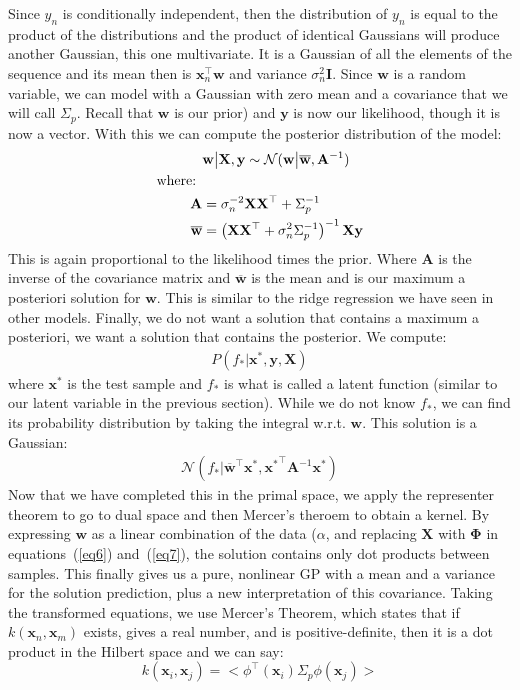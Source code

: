 \documentclass[journal]{IEEEtran}
\begin{document}
Since \(y_n\) is conditionally independent, then the distribution of \(y_n\) is equal to the product of the distributions and the product of identical Gaussians will produce another Gaussian, this one multivariate. It is a Gaussian of all the elements of the sequence and its mean then is \(\mathbf{x}_n^\top \mathbf{w}\) and variance \(\sigma_n^2 \mathbf{I}\). Since \(\mathbf{w}\) is a random variable, we can model with a Gaussian with zero mean and a covariance that we will call \(\Sigma_p\). Recall that \(\mathbf{w}\) is our prior) and \(\mathbf{y}\) is now our likelihood, though it is now a vector. With this we can compute the posterior distribution of the model:
\begin{align}
    &\mathbf{w} \big| \mathbf{X}, \mathbf{y} \sim \mathcal{N}(\mathbf{w}\big| \overline{\mathbf{w}}, \mathbf{A}^{-1})\\
    \notag\text{where: }\\
    \mathbf{A} &= \sigma_n^{-2}\mathbf{X}\mathbf{X}^\top + \Sigma_p^{-1}\label{eq6}\\
    \overline{\mathbf{w}} &= \left(\mathbf{X}\mathbf{X}^\top + \sigma_n^{2}\Sigma_p^{-1}\right)^{-1}\mathbf{X}\mathbf{y}\label{eq7}
\end{align}
This is again proportional to the likelihood times the prior. Where \(\mathbf{A}\) is the inverse of the covariance matrix and \(\overline{\mathbf{w}}\) is the mean and is our maximum a posteriori solution for \(\mathbf{w}\). This is similar to the ridge regression we have seen in other models. Finally, we do not want a solution that contains a maximum a posteriori, we want a solution that contains the posterior. We compute:
\begin{align}
    P(f_* \big| \mathbf{x}^*,\mathbf{y},\mathbf{X})
\end{align}
where \(\mathbf{x}^*\) is the test sample and \(f_*\) is what is called a latent function (similar to our latent variable in the previous section). While we do not know \(f_*\), we can find its probability distribution by taking the integral w.r.t. \(\mathbf{w}\). This solution is a Gaussian:
\begin{align}
    \mathcal{N}\left(f_*\big| \overline{\mathbf{w}}^\top \mathbf{x}^*, {\mathbf{x}^*}^\top \mathbf{A}^{-1}\mathbf{x}^*\right)
\end{align}
Now that we have completed this in the primal space, we apply the representer theorem to go to dual space and then Mercer's theroem to obtain a kernel. By expressing \(\mathbf{w}\) as a linear combination of the data (\(\alpha\), and replacing \(\mathbf{X}\) with \(\mathbf{\Phi}\) in equations~(\ref{eq6}) and~(\ref{eq7}), the solution contains only dot products between samples. This finally gives us a pure, nonlinear GP with a mean and a variance for the solution prediction, plus a new interpretation of this covariance. Taking the transformed equations, we use Mercer's Theorem, which states that if \(k (\mathbf{x}_n, \mathbf{x}_m)\) exists, gives a real number, and is positive-definite, then it is a dot product in the Hilbert space and we can say:
\begin{equation}
    k (\mathbf{x}_i, \mathbf{x}_j) = <\phi^\top(\mathbf{x}_i) \Sigma_p \phi (\mathbf{x}_j)>
\end{equation}
\end{document}
